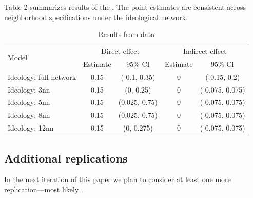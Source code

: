 \documentclass[12pt]{article}
\begin{document}
Table 2 summarizes results of the \citet{bergan2015call}. The point estimates are consistent across neighborhood specifications under the ideological network.

\begin{table}[h]
\centering
\begin{tabular}{lcccc}
\toprule
\multirow{2}{*}{Model} & \multicolumn{2}{c}{Direct effect} & \multicolumn{2}{c}{Indirect effect} \\
\cmidrule(l){2-3} \cmidrule(l){4-5}
 & Estimate & 95\% CI & Estimate & 95\% CI \\
\midrule
Ideology: full network  & 0.15 & (-0.1, 0.35) &  0 & (-0.15, 0.2)\\
Ideology: 3nn & 0.15 & (0, 0.25) & 0 & (-0.075, 0.075)\\
Ideology: 5nn & 0.15 & (0.025, 0.75) & 0 & (-0.075, 0.075)\\
Ideology: 8nn & 0.15 & (0.025, 0.75) & 0 & (-0.075, 0.075)\\
Ideology: 12nn & 0.15 & (0, 0.275) & 0 & (-0.075, 0.075)\\
\bottomrule
\end{tabular}
\caption{Results from \citet{bergan2015call} data}
\end{table}

\subsection{Additional replications}
In the next iteration of this paper we plan to consider at least one more replication---most likely \citet{broockman2013black}.
\end{document}
